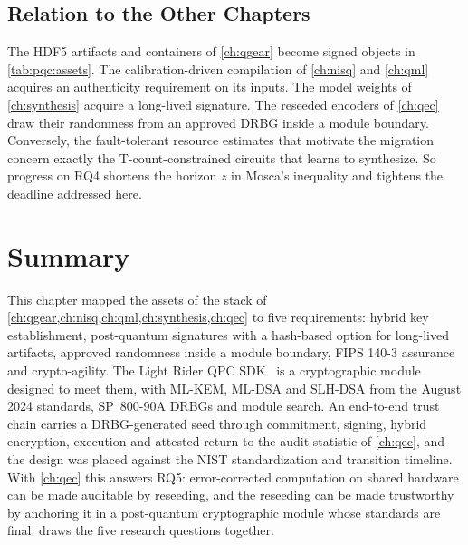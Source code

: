 \subsection{Relation to the Other Chapters}\label{sec:pqc:relation}

The HDF5 artifacts and containers of \cref{ch:qgear} become signed objects in \cref{tab:pqc:assets}. The calibration-driven compilation of \cref{ch:nisq} and \cref{ch:qml} acquires an authenticity requirement on its inputs. The model weights of \cref{ch:synthesis} acquire a long-lived signature. The reseeded encoders of \cref{ch:qec} draw their randomness from an approved DRBG inside a module boundary. Conversely, the fault-tolerant resource estimates that motivate the migration~\cite{gidney2021rsa,gidney2025million} concern exactly the T-count-constrained circuits that \rubriq{} learns to synthesize. So progress on RQ4 shortens the horizon $z$ in Mosca's inequality and tightens the deadline addressed here.

\section{Summary}\label{sec:pqc:summary}

This chapter mapped the assets of the stack of \cref{ch:qgear,ch:nisq,ch:qml,ch:synthesis,ch:qec} to five requirements: hybrid key establishment, post-quantum signatures with a hash-based option for long-lived artifacts, approved randomness inside a module boundary, FIPS 140-3 assurance and crypto-agility. The Light Rider QPC SDK~\cite{guo2026lightriderqpc} is a cryptographic module designed to meet them, with ML-KEM, ML-DSA and SLH-DSA from the August 2024 standards, SP~800-90A DRBGs and module search. An end-to-end trust chain carries a DRBG-generated seed through commitment, signing, hybrid encryption, execution and attested return to the audit statistic of \cref{ch:qec}, and the design was placed against the NIST standardization and transition timeline. With \cref{ch:qec} this answers RQ5: error-corrected computation on shared hardware can be made auditable by reseeding, and the reseeding can be made trustworthy by anchoring it in a post-quantum cryptographic module whose standards are final.  draws the five research questions together.
